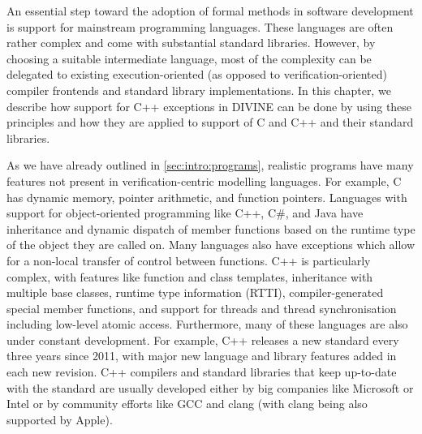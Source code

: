 
\bigskip\noindent
An essential step toward the adoption of formal methods in software development
is support for mainstream programming languages.
These languages are often rather complex and come with substantial standard
libraries.
However, by choosing a suitable intermediate language, most of the complexity
can be delegated to existing execution-oriented (as opposed to
verification-oriented) compiler frontends and standard library implementations.
In this chapter, we describe how support for C++ exceptions in DIVINE can be done by using these principles and how they are applied to support of C and C++ and their standard libraries.


As we have already outlined in \autoref{sec:intro:programs}, realistic
programs have many features not present in verification-centric modelling
languages.
For example, C has dynamic memory, pointer arithmetic, and function pointers.
Languages with support for object-oriented programming like C++, C\#, and Java
have inheritance and dynamic dispatch of member functions based on the runtime
type of the object they are called on.
Many languages also have exceptions which allow for a non-local transfer of
control between functions.
C++ is particularly complex, with features like function and class
templates,%
inheritance with multiple base classes, runtime type information (RTTI),
compiler-generated special member functions,%
and support for threads and thread synchronisation including low-level atomic
access.
Furthermore, many of these languages are also under constant development.
For example, C++ releases a new standard every three years since 2011, with
major new language and library features added in each new revision.
C++ compilers and standard libraries that keep up-to-date with the standard
are usually developed either by big companies like Microsoft or Intel or by
community efforts like GCC and clang (with clang being also supported by
Apple).

